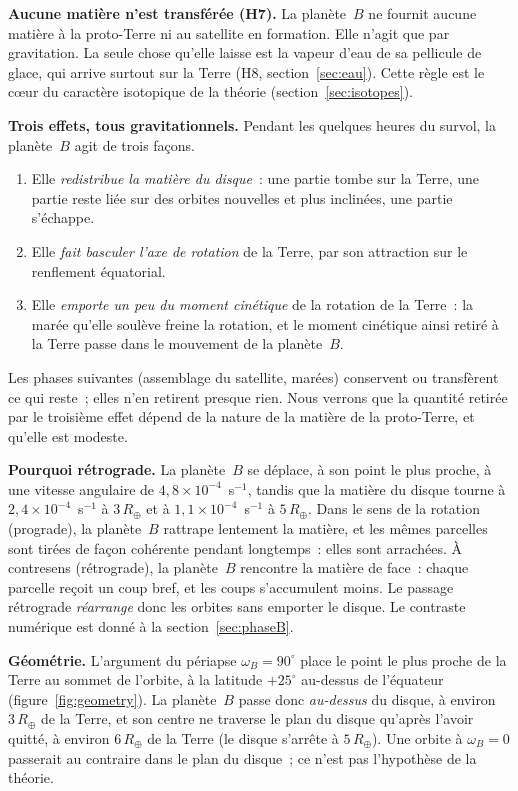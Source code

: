 \documentclass[11pt,a4paper]{article}
\newcommand{\Rt}{\ensuremath{R_\oplus}}
\begin{document}
\textbf{Aucune matière n'est transférée (H7).} La planète~$B$ ne fournit aucune matière à la proto-Terre ni au satellite en formation. Elle n'agit que par gravitation. La seule chose qu'elle laisse est la vapeur d'eau de sa pellicule de glace, qui arrive surtout sur la Terre (H8, section~\ref{sec:eau}). Cette règle est le cœur du caractère isotopique de la théorie (section~\ref{sec:isotopes}).

\textbf{Trois effets, tous gravitationnels.} Pendant les quelques heures du survol, la planète~$B$ agit de trois façons.
\begin{enumerate}[leftmargin=1.6em,itemsep=2pt]
\item Elle \emph{redistribue la matière du disque}~: une partie tombe sur la Terre, une partie reste liée sur des orbites nouvelles et plus inclinées, une partie s'échappe.
\item Elle \emph{fait basculer l'axe de rotation} de la Terre, par son attraction sur le renflement équatorial.
\item Elle \emph{emporte un peu du moment cinétique} de la rotation de la Terre~: la marée qu'elle soulève freine la rotation, et le moment cinétique ainsi retiré à la Terre passe dans le mouvement de la planète~$B$.
\end{enumerate}
Les phases suivantes (assemblage du satellite, marées) conservent ou transfèrent ce qui reste~; elles n'en retirent presque rien. Nous verrons que la quantité retirée par le troisième effet dépend de la nature de la matière de la proto-Terre, et qu'elle est modeste.

\textbf{Pourquoi rétrograde.} La planète~$B$ se déplace, à son point le plus proche, à une vitesse angulaire de $4{,}8\times10^{-4}$~s$^{-1}$, tandis que la matière du disque tourne à $2{,}4\times10^{-4}$~s$^{-1}$ à $3\,\Rt$ et à $1{,}1\times10^{-4}$~s$^{-1}$ à $5\,\Rt$. Dans le sens de la rotation (prograde), la planète~$B$ rattrape lentement la matière, et les mêmes parcelles sont tirées de façon cohérente pendant longtemps~: elles sont arrachées. À contresens (rétrograde), la planète~$B$ rencontre la matière de face~: chaque parcelle reçoit un coup bref, et les coups s'accumulent moins. Le passage rétrograde \emph{réarrange} donc les orbites sans emporter le disque. Le contraste numérique est donné à la section~\ref{sec:phaseB}.

\textbf{Géométrie.} L'argument du périapse $\omega_B=90^\circ$ place le point le plus proche de la Terre au sommet de l'orbite, à la latitude $+25^\circ$ au-dessus de l'équateur (figure~\ref{fig:geometry}). La planète~$B$ passe donc \emph{au-dessus} du disque, à environ $3\,\Rt$ de la Terre, et son centre ne traverse le plan du disque qu'après l'avoir quitté, à environ $6\,\Rt$ de la Terre (le disque s'arrête à $5\,\Rt$). Une orbite à $\omega_B=0$ passerait au contraire dans le plan du disque~; ce n'est pas l'hypothèse de la théorie.
\end{document}
